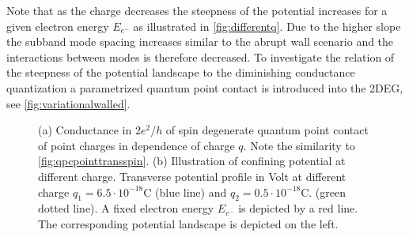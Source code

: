 Note that as the charge decreases the steepness of the potential increases for a given electron energy $E_{e^-}$ as illustrated in \cref{fig:differentq}. Due to the higher slope the subband mode spacing increases similar to the abrupt wall scenario and the interactions between modes is therefore decreased.
 To investigate the relation of the steepness of the potential landscape to the diminishing conductance quantization a parametrized  quantum point contact is introduced into the 2DEG, see \cref{fig:variationalwalled}.
\begin{figure}[h]
\centering
{}
\caption{(a) Conductance in 2$e^2/h$ of spin degenerate quantum point contact of point charges in dependence of charge $q$. Note the similarity to \cref{fig:qpcpointtransspin}. (b) Illustration of confining potential at different charge. Transverse potential profile in Volt at different charge $q_1 = 6.5 \cdot 10^{-18}$C (blue line) and $q_2= 0.5 \cdot 10^{-18}$C. (green dotted line). A fixed electron energy $E_{e^-}$ is depicted by a red line. The corresponding potential landscape is depicted on the left.}\label{fig:pointtrans}
\end{figure}
\FloatBarrier

